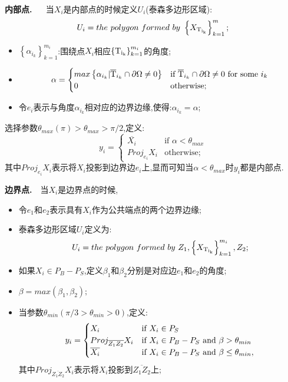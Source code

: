 \documentclass[9pt, a4paper,eqno]{article}
\theoremstyle{plain}
\begin{document}
\begin{CJK}{UTF8}{gkai}
{\bf 内部点.} ~~	当$X_i$是内部点的时候定义$U_i$(泰森多边形区域):
$$U_i = the~ polygon~formed~by~\left\lbrace X_{\rm T_{i_k}} \right\rbrace _{k=1}^{m};$$
\begin{itemize}
\item $\left\lbrace \alpha_{i_k} \right\rbrace_{k=1}^{m_i}$:围绕点$X_i$相应$\left\lbrace \rm T_{i_k} \right\rbrace_{k=1}^{m_i}$的角度;
\item
\begin{equation}
   \alpha=
   \begin{cases}
   max \left\lbrace \alpha_{i_k}| \overline{\rm T}_{i_k} \cap \partial \Omega \neq 0  \right\rbrace  &\mbox{if $\overline{\rm T}_{i_k} \cap \partial \Omega \neq 0$ for some $i_k$}\\
   0 &\mbox{otherwise;}
   \end{cases}
\end{equation}
\item 令$e_i$表示与角度$\alpha_{i_k}$相对应的边界边缘,使得:$\alpha _{i_k}=\alpha$;
\end{itemize}
选择参数$\theta_{max}(\pi) > \theta_{max} > \pi / 2$,定义:
\begin{equation}
   y_i=
   \begin{cases}
  \overline{X_i}  &\mbox{if $\alpha < \theta_{max}$}\\
   Proj_{e_i}X_i &\mbox{otherwise;}
   \end{cases}
\end{equation}
其中$Proj_{e_i}X_i$表示将$X_i$投影到边界边$e_i$上,显而可知当$\alpha < \theta_{max}$时$y_i$都是内部点.

{\bf 边界点.}~~当$X_i$是边界点的时候,
\begin{itemize}
\item 令$e_1$和$e_2$表示具有$X_i$作为公共端点的两个边界边缘;
\item 泰森多边形区域$U_i$定义为:$$U_i = the~polygon~formed~by~Z_1,\left\lbrace X_{\rm T_{i_k}} \right\rbrace_{k=1}^{m_i},Z_2;$$
\item 如果$X_i \in P_B - P_S$,定义$\beta_1$和$\beta_2$分别是对应边$e_1$和$e_2$的角度;
\item $\beta = max(\beta_1,\beta_2);$
\item 当参数$\theta_{min}(\pi/3 > \theta_{min} > 0)$,定义:
\begin{equation}
   y_i=
   \begin{cases}
  X_i  &\mbox{if $ X_i \in P_S$}\\
   Proj_{\overline{Z_1Z_2}}X_i &\mbox{if $X_i \in P_B - P_S$~and~$\beta > \theta_{min}$}\\
   \overline{X_i} &\mbox{if $X_i \in P_B - P_S$~and~$\beta \leq \theta_{min},$}
   \end{cases}
\end{equation}
其中$Proj_{\overline{Z_1Z_2}}X_i$表示将$X_i$投影到$\overline{Z_1Z_2}$上;
\end{itemize}


\end{CJK}
\end{document}
